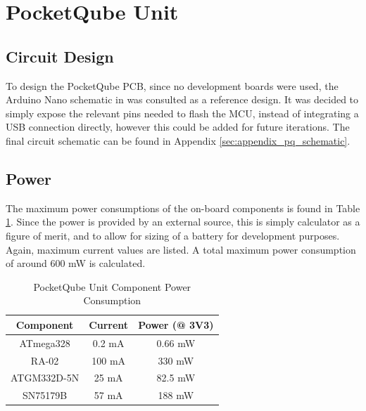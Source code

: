 \graphicspath{{./figures}}

\section{PocketQube Unit}
\subsection{Circuit Design}
To design the PocketQube PCB, since no development boards were used, the Arduino Nano schematic in \cite{design-arduinoNano} was consulted as a reference design. It was decided to simply expose the relevant pins needed to flash the MCU, instead of integrating a USB connection directly, however this could be added for future iterations. The final circuit schematic can be found in Appendix \ref{sec:appendix_pq_schematic}.

\subsection{Power}
The maximum power consumptions of the on-board components is found in Table \ref{tab:pqunit_component_consumption}. Since the power is provided by an external source, this is simply calculator as a figure of merit, and to allow for sizing of a battery for development purposes. Again, maximum current values are listed. A total maximum power consumption of around 600 mW is calculated.
\begin{table}[!htb]
  \centering
  \renewcommand{\arraystretch}{1.2}
  \begin{tabular}{ |c|c|c| }
  \hline
  \textbf{Component}        & \textbf{Current}        & \textbf{Power (@ 3V3)}      \\ \hline 
  ATmega328                 & 0.2 mA                  & 0.66 mW                     \\ \hline 
  RA-02                     & 100 mA                  & 330 mW                      \\ \hline 
  ATGM332D-5N               & 25 mA                   & 82.5 mW                     \\ \hline
  SN75179B                  & 57 mA                   & 188 mW                      \\ \hline
  \end{tabular}
  \caption{PocketQube Unit Component Power Consumption}
  \label{tab:pqunit_component_consumption}
\end{table}


